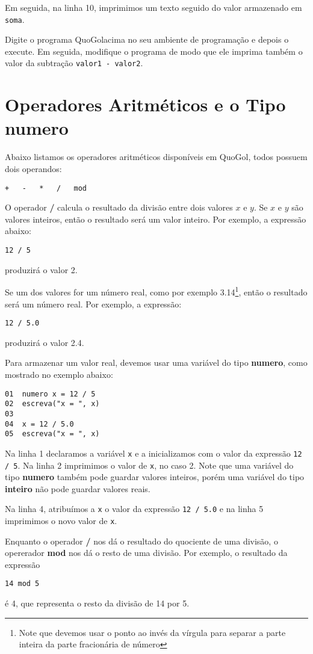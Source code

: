 \documentclass{report}
\newcommand{\Qgol}{QuoGol\;}
\begin{document}
Em seguida, na linha 10, imprimimos um texto seguido do valor armazenado
em \texttt{soma}. 

Digite o programa \Qgol acima no seu ambiente de programação
e depois o execute. Em seguida, modifique o programa de modo que
ele imprima também o valor da subtração \texttt{valor1 - valor2}.



\section{Operadores Aritméticos e o Tipo \textbf{numero}}

Abaixo listamos os operadores aritméticos disponíveis em \Qgol,
todos possuem dois operandos:
\begin{verbatim}
+   -   *   /   mod
\end{verbatim}


O operador \textbf{/} calcula o resultado da divisão entre dois valores
$x$ e $y$. Se $x$ e $y$ são valores inteiros, então o resultado será um
valor inteiro. Por exemplo, a expressão abaixo:
\begin{verbatim}
12 / 5
\end{verbatim}
produzirá o valor 2.

Se um dos valores for um número real, como por exemplo 3.14\footnote{Note que devemos
usar o ponto ao invés da vírgula para separar a parte inteira da parte fracionária de número},
então o resultado será um número real. Por exemplo, a expressão:
\begin{verbatim}
12 / 5.0
\end{verbatim}
produzirá o valor 2.4.

Para armazenar um valor real, devemos usar uma variável do tipo
\textbf{numero}, como mostrado no exemplo abaixo:
\begin{verbatim}
01  numero x = 12 / 5
02  escreva("x = ", x)
03
04  x = 12 / 5.0
05  escreva("x = ", x)
\end{verbatim}
%
Na linha 1 declaramos a variável \texttt{x} e a inicializamos
com o valor da expressão \texttt{12 / 5}. Na linha 2 imprimimos
o valor de \texttt{x}, no caso 2. Note que uma variável do tipo
\textbf{numero} também pode guardar valores inteiros, porém uma
variável do tipo \textbf{inteiro} não pode guardar valores reais.

Na linha 4, atribuímos a \texttt{x} o valor da expressão \texttt{12 / 5.0}
e na linha 5 imprimimos o novo valor de \texttt{x}.

Enquanto o operador \textbf{/} nos dá o resultado do quociente
de uma divisão, o opererador \textbf{mod} nos dá o resto de uma
divisão. Por exemplo, o resultado da expressão
\begin{verbatim}
14 mod 5
\end{verbatim}
é 4, que representa o resto da divisão de 14 por 5.
\end{document}

